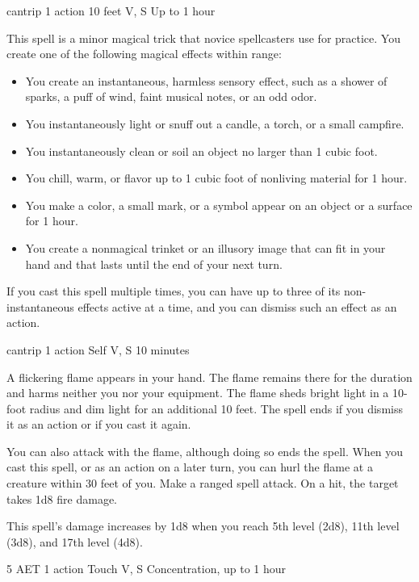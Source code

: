 \label{spell:prestidigitation}
{cantrip}
{1 action}
{10 feet}
{V, S}
{Up to 1 hour}

This spell is a minor magical trick that novice spellcasters use for practice. You create one of the following magical effects within range:

\begin{itemize}
\item You create an instantaneous, harmless sensory effect, such as a shower of sparks, a puff of wind, faint musical notes, or an odd odor.
\item You instantaneously light or snuff out a candle, a torch, or a small campfire.
\item You instantaneously clean or soil an object no larger than 1 cubic foot.
\item You chill, warm, or flavor up to 1 cubic foot of nonliving material for 1 hour.
\item You make a color, a small mark, or a symbol appear on an object or a surface for 1 hour.
\item You create a nonmagical trinket or an illusory image that can fit in your hand and that lasts until the end of your next turn.
\end{itemize}

If you cast this spell multiple times, you can have up to three of its non-instantaneous effects active at a time, and you can dismiss such an effect as an action.

\label{spell:produce-flame}
{cantrip}
{1 action}
{Self}
{V, S}
{10 minutes}

A flickering flame appears in your hand. The flame remains there for the duration and harms neither you nor your equipment. The flame sheds bright light in a 10-foot radius and dim light for an additional 10 feet. The spell ends if you dismiss it as an action or if you cast it again.

You can also attack with the flame, although doing so ends the spell. When you cast this spell, or as an action on a later turn, you can hurl the flame at a creature within 30 feet of you. Make a ranged spell attack. On a hit, the target takes 1d8 fire damage.

This spell's damage increases by 1d8 when you reach 5th level (2d8), 11th level (3d8), and 17th level (4d8).

\label{spell:protection-from-energy}
{5 AET}
{1 action}
{Touch}
{V, S}
{Concentration, up to 1 hour}

